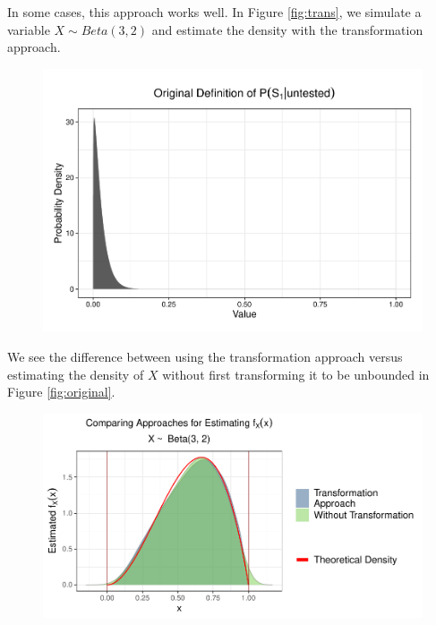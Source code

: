 \documentclass[12pt,twoside]{smiththesis}
\begin{document}
In some cases, this approach works well. In Figure \ref{fig:trans}, we simulate a variable \(X \sim Beta(3,2)\) and estimate the density with the transformation approach.
\begin{figure}

{\centering \includegraphics[width=1\linewidth]{thesis_files/figure-latex/unnamed-chunk-38-1} 

}

\caption{\label{fig:trans}}\label{fig:unnamed-chunk-38}
\end{figure}
We see the difference between using the transformation approach versus estimating the density of \(X\) without first transforming it to be unbounded in Figure \ref{fig:original}.
\begin{figure}

{\centering \includegraphics[width=1\linewidth]{thesis_files/figure-latex/create-fig-original-1} 

}

\caption{\label{fig:original}}\label{fig:create-fig-original}
\end{figure}
\end{document}

